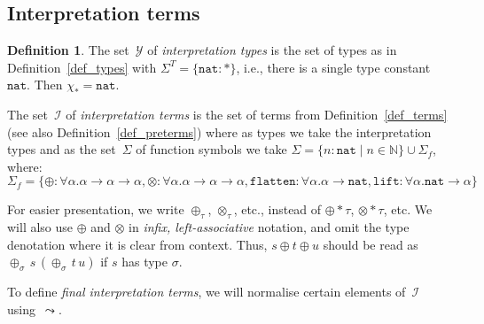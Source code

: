 \documentclass[a4paper,UKenglish,cleveref,autoref,numberwithinsect]{lipics-v2019}
\theoremstyle{definition}
\newtheorem{defn}[theorem]{Definition}
\newcommand{\Iterms}{\mathcal{I}}
\newcommand{\ITypes}{\mathcal{Y}}
\newcommand{\arrtype}{\rightarrow}
\newcommand{\tapp}[2]{#1 * #2}
\newcommand{\arrW}{\leadsto}
\newcommand{\nat}{\mathtt{nat}}
\newcommand{\flatten}{\mathtt{flatten}}
\newcommand{\lift}{\mathtt{lift}}
\newcommand{\Nbb}{\mathbb{N}}
\begin{document}
\subsection{Interpretation terms}

\begin{defn}\label{def_iterms}
  The set~$\ITypes$ of \emph{interpretation types} is the set of types
  as in Definition~\ref{def_types} with $\Sigma^T = \{ \nat : * \}$,
  i.e., there is a single type constant~$\nat$. Then $\chi_* = \nat$.

  The set~$\Iterms$ of \emph{interpretation terms} is the set of terms
  from Definition~\ref{def_terms} (see also
  Definition~\ref{def_preterms}) where as types we take the
  interpretation types and as the set~$\Sigma$ of function symbols we
  take $\Sigma = \{ n : \nat \mid n \in \Nbb \} \cup \Sigma_f$, where:
  \[
      \Sigma_f = \{ \oplus : \forall \alpha . \alpha \arrtype
                 \alpha \arrtype \alpha, \otimes : \forall \alpha . \alpha \arrtype \alpha
                 \arrtype \alpha, \flatten : \forall \alpha . \alpha \arrtype
                 \nat, \lift : \forall \alpha . \nat \arrtype \alpha
                 \}
  \]
\end{defn}

For easier presentation, we write $\oplus_\tau$, $\otimes_\tau$, etc.,
instead of $\tapp{\oplus}{\tau}$, $\tapp{\otimes}{\tau}$, etc. We will
also use $\oplus$ and $\otimes$ in \emph{infix, left-associative}
notation, and omit the type denotation where it is clear from
context. Thus, $s \oplus t \oplus u$ should be read as
$\oplus_\sigma\,s\,(\oplus_\sigma\,t\,u)$ if $s$ has type $\sigma$.

To define \emph{final interpretation terms}, we will normalise certain
elements of~$\Iterms$ using~$\arrW{}$.
\end{document}
